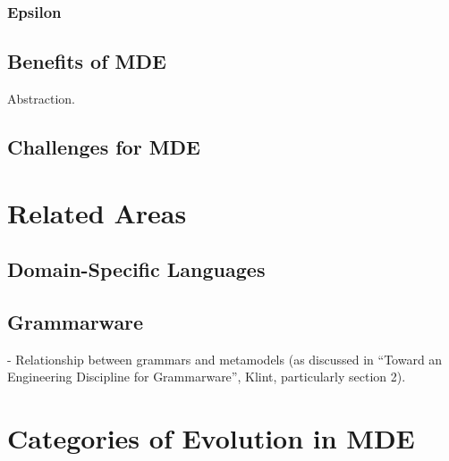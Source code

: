 \subsubsection{Epsilon}
\label{subsubsec:epsilon}



\subsection{Benefits of MDE}
\label{subsec:mde_benefits}
Abstraction.

\subsection{Challenges for MDE}


\section{Related Areas}

\subsection{Domain-Specific Languages}
\label{subsec:dsls}

\subsection{Grammarware}
\label{subsec:grammarware}
- Relationship between grammars and metamodels (as discussed in ``Toward an Engineering Discipline for Grammarware'', Klint, particularly section 2).

\section{Categories of Evolution in MDE}
